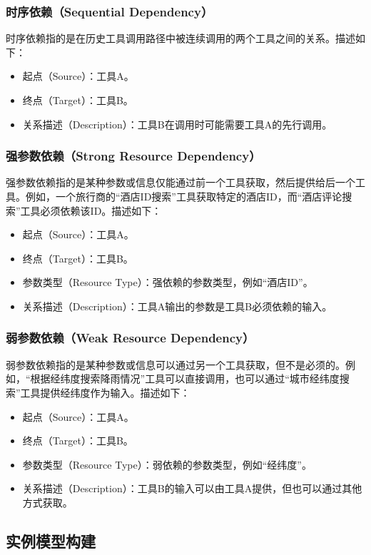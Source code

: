 \subsubsection{时序依赖（Sequential Dependency）}
时序依赖指的是在历史工具调用路径中被连续调用的两个工具之间的关系。描述如下：
\begin{itemize}
    \item 起点（Source）：工具A。
    \item 终点（Target）：工具B。
    \item 关系描述（Description）：工具B在调用时可能需要工具A的先行调用。
\end{itemize}

\subsubsection{强参数依赖（Strong Resource Dependency）}
强参数依赖指的是某种参数或信息仅能通过前一个工具获取，然后提供给后一个工具。例如，一个旅行商的“酒店ID搜索”工具获取特定的酒店ID，而“酒店评论搜索”工具必须依赖该ID。描述如下：
\begin{itemize}
    \item 起点（Source）：工具A。
    \item 终点（Target）：工具B。
    \item 参数类型（Resource Type）：强依赖的参数类型，例如``酒店ID''。
    \item 关系描述（Description）：工具A输出的参数是工具B必须依赖的输入。
\end{itemize}

\subsubsection{弱参数依赖（Weak Resource Dependency）}
弱参数依赖指的是某种参数或信息可以通过另一个工具获取，但不是必须的。例如，“根据经纬度搜索降雨情况”工具可以直接调用，也可以通过“城市经纬度搜索”工具提供经纬度作为输入。描述如下：
\begin{itemize}
    \item 起点（Source）：工具A。
    \item 终点（Target）：工具B。
    \item 参数类型（Resource Type）：弱依赖的参数类型，例如``经纬度''。
    \item 关系描述（Description）：工具B的输入可以由工具A提供，但也可以通过其他方式获取。
\end{itemize}

\subsection{实例模型构建}

